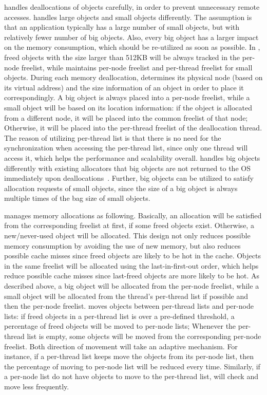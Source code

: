 \NA{} handles deallocations of objects carefully, in order to prevent unnecessary remote accesses. \NA{} handles large objects and small objects differently. The assumption is that an application typically has a large number of small objects, but with relatively fewer number of big objects. Also, every big object has a larger impact on the memory consumption, which should be re-utilized as soon as possible. In \NM{}, freed objects with the size larger than 512KB will be always tracked in the per-node freelist, while \NA{} maintains per-node freelist and per-thread freelist for small objects. During each memory deallocation, \NA{} determines its physical node (based on its virtual address) and the size information of an object in order to place it correspondingly. A big object is always placed into a per-node freelist, while a small object will be based on its location information: if the object is allocated from a different node, it will be placed into the common freelist of that node; Otherwise, it will be placed into the per-thread freelist of the deallocation thread. The reason of utilizing per-thread list is that there is no need for the synchronization when accessing the per-thread list, since only one thread will access it, which helps the performance and scalability overall. \NM{} handles big objects differently with existing allocators that big objects are not returned to the OS immediately upon deallocations~\cite{Hoard, tcmalloc}. Further, big objects can be utilized to satisfy allocation requests of small objects, since the size of a big object is always multiple times of the bag size of small objects.  

 
\NA{} manages memory allocations as following. Basically, an allocation will be satisfied from the corresponding freelist at first, if some freed objects exist. Otherwise, a new/never-used object will be allocated. This design not only reduces possible memory consumption by avoiding the use of new memory, but also reduces possible cache misses since freed objects are likely to be hot in the cache. Objects in the same freelist will be allocated using the last-in-first-out order, which helps reduce possible cache misses since last-freed objects are more likely to be hot. As described above, a big object will be allocated from the per-node freelist, while a small object will be allocated from the thread's per-thread list if possible and then the per-node freelist. \NM{} moves objects between per-thread lists and per-node lists: if freed objects in a per-thread list is over a pre-defined threshold, a percentage of freed objects will be moved to per-node lists; Whenever the per-thread list is empty, some  objects will be moved from the corresponding per-node freelist. Both direction of movement will take an adaptive mechanism. For instance, if a per-thread list keeps move the objects from its per-node list, then the percentage of moving to per-node list will be reduced every time. Similarly, if a per-node list do not have objects to move to the per-thread list, \NM{} will check and move less frequently.  

